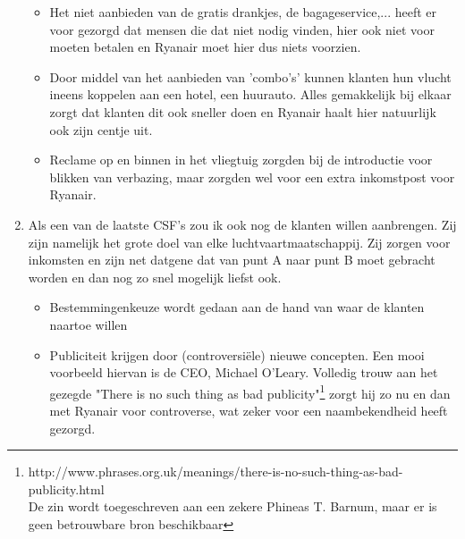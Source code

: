 \documentclass{article}
\begin{document}
\begin{enumerate}
\begin{itemize}
\item Het niet aanbieden van de gratis drankjes, de bagageservice,... heeft er voor gezorgd dat mensen die dat niet nodig vinden, hier ook niet voor moeten betalen en Ryanair moet hier dus niets voorzien. 
\item Door middel van het aanbieden van 'combo's' kunnen klanten hun vlucht ineens koppelen aan een hotel, een huurauto. Alles gemakkelijk bij elkaar zorgt dat klanten dit ook sneller doen en Ryanair haalt hier natuurlijk ook zijn centje uit.
\item Reclame op en binnen in het vliegtuig zorgden bij de introductie voor blikken van verbazing, maar zorgden wel voor een extra inkomstpost voor Ryanair.
\end{itemize}

\item Als een van de laatste CSF's zou ik ook nog de klanten willen aanbrengen. Zij zijn namelijk het grote doel van elke luchtvaartmaatschappij. Zij zorgen voor inkomsten en zijn net datgene dat van punt A naar punt B moet gebracht worden en dan nog zo snel mogelijk liefst ook.
\begin{itemize}
\item Bestemmingenkeuze wordt gedaan aan de hand van waar de klanten naartoe willen
\item Publiciteit krijgen door (controversi\"ele) nieuwe concepten.
Een mooi voorbeeld hiervan is de CEO, Michael O'Leary. Volledig trouw aan het gezegde "There is no such thing as bad publicity"\footnote{http://www.phrases.org.uk/meanings/there-is-no-such-thing-as-bad-publicity.html \\
De zin wordt toegeschreven aan een zekere Phineas T. Barnum, maar er is geen betrouwbare bron beschikbaar} zorgt hij zo nu en dan met Ryanair voor controverse, wat zeker voor een naambekendheid heeft gezorgd.
\end{itemize}
\end{enumerate}
\end{document}
